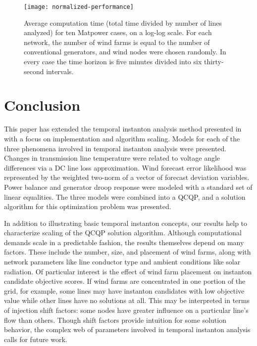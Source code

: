 \documentclass[journal,twoside]{IEEEtran}
\begin{document}
\begin{figure}
\centering
\texttt{[image: normalized-performance]}
\caption{Average computation time (total time divided by number of lines analyzed) for ten Matpower cases, on a log-log scale. For each network, the number of wind farms is equal to the number of conventional generators, and wind nodes were chosen randomly. In every case the time horizon is five minutes divided into six thirty-second intervals.}
\label{fig:normalized-performance}
\end{figure}


\section{Conclusion}\label{sec:conclusion}
This paper has extended the temporal instanton analysis method presented in \cite{kersulis2015} with a focus on implementation and algorithm scaling. Models for each of the three phenomena involved in temporal instanton analysis were presented. Changes in transmission line temperature were related to voltage angle differences via a DC line loss approximation. Wind forecast error likelihood was represented by the weighted two-norm of a vector of forecast deviation variables. Power balance and generator droop response were modeled with a standard set of linear equalities. The three models were combined into a QCQP, and a solution algorithm for this optimization problem was presented.

In addition to illustrating basic temporal instanton concepts, our results help to characterize scaling of the QCQP solution algorithm. Although computational demands scale in a predictable fashion, the results themselves depend on many factors. These include the number, size, and placement of wind farms, along with network parameters like line conductor type and ambient conditions like solar radiation. Of particular interest is the effect of wind farm placement on instanton candidate objective scores. If wind farms are concentrated in one portion of the grid, for example, some lines may have instanton candidates with low objective value while other lines have no solutions at all. This may be interpreted in terms of injection shift factors: some nodes have greater influence on a particular line's flow than others. Though shift factors provide intuition for some solution behavior, the complex web of parameters involved in temporal instanton analysis calls for future work.
\end{document}

